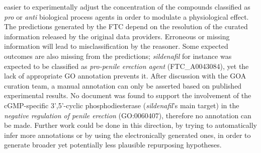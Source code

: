 \documentclass{bioinfo}
\begin{document}
easier to experimentally adjust the concentration of the compounds classified as \emph{pro} or \emph{anti} biological process agents 
in order to modulate a physiological effect.
The predictions generated by the FTC depend on the resolution of the curated information released by 
the original data providers. Erroneous or missing information will lead to misclassification by the reasoner. 
Some expected outcomes are also missing from the predictions; \emph{sildenafil} for instance was expected to be classified 
as \emph{pro-penile erection agent} (FTC\_A0043084), yet the lack of appropriate GO annotation prevents it. After discussion 
with the GOA curation team, a manual annotation can only be asserted based on published experimental results. No document 
was found to support the involvement of the cGMP-specific 3',5'-cyclic phosphodiesterase (\emph{sildenafil}'s main target) 
in the \emph{negative regulation of penile erection} (GO:0060407), therefore no annotation can be made. Further work could be done 
in this direction, by trying to automatically infer more annotations or by using the electronically generated ones, in order 
to generate broader yet potentially less plausible repurposing hypotheses.
\end{document}

